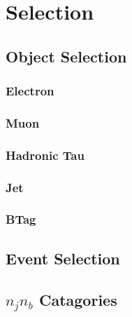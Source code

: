 \chapter{Selection}

\section{Object Selection}
\subsection{Electron}

\subsection{Muon}

\subsection{Hadronic Tau}

\subsection{Jet}

\subsection{BTag}



\section{Event Selection}

\section{\texorpdfstring{ $n_j n_b$}{Lg} Catagories}


